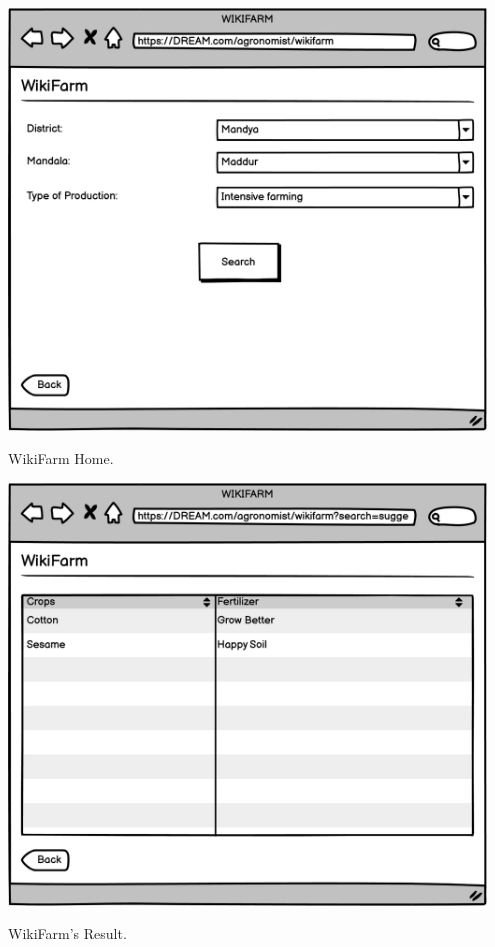 \begin{minipage}{.5\textwidth}
	\centering
	\includegraphics[width=0.95\textwidth]{Images/Mockup/Agronomist/13AgronomistWikiFarm.png}
	\captionsetup{type=figure}
	\caption{WikiFarm Home.}
\end{minipage}%
\begin{minipage}{.5\textwidth}
	\centering
	\includegraphics[width=0.95\textwidth]{Images/Mockup/Agronomist/14AgronomistWikiFarmSuggestions.png}
	\captionsetup{type=figure}
	\caption{WikiFarm's Result.}
\end{minipage}
